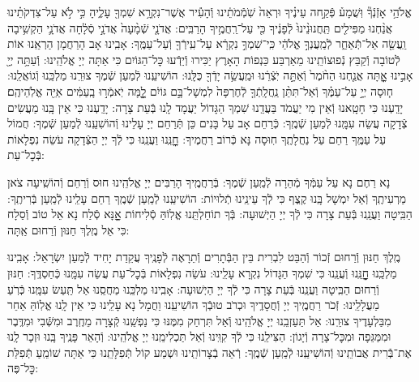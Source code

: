 \documentclass[twoside, openany, parskip=half, 11pt]{book}
\begin{document}
אֱלֹהַ֥י אָזְֿנְֿךָ֘ וּֽשֲׁמָע֒ פְּֿקַ֣חה עֵינֶ֗יךָ וּרְאֵה֙ שֹֽׁמְֿמֹתֵ֔ינוּ וְֿהָעִ֕יר אֲשֶׁר־נִקְרָ֥א שִׁמְךָ֖ עָלֶ֑יהָ כִּ֣י לֹ֣א עַל־צִדְקֹתֵ֗ינוּ אֲנַ֨חְנוּ מַפִּילִ֤ים תַּֽחֲנוּנֵ֨ינוּ֙ לְֿפָנֶ֔יךָ כִּ֖י עַל־רַֽחֲמֶ֥יךָ הָרַבִּֽים: אֲדֹנָ֤י שְֿׁמָ֨עָה֙ אֲדֹנָ֣י סְֿלָ֔חָה אֲדֹנָ֛י הַקְשִׁ֥יבָה וַֽעֲשֵׂ֖ה אַל־תְּֿֿאַחַ֑ר לְֿמַֽעֲנְךָ֣ אֱלֹהַ֔י כִּֽי־שִׁמְךָ֣ נִקְרָ֔א עַל־עִֽירְֿךָ֖ וְֿעַל־עַמֶּֽךָ: אָבִֽינוּ אָב הָרַחֲמָן הַרְאֵֽנוּ אוֹת לְֿטוֹבָה וְֿקַבֵּץ נְֿפוּצוֹתֵֽינוּ מֵאַרְבַּע כַּנְפוֹת הָאָרֶץ יַכִּירוּ וְֿיֵדְֿעוּ כׇּל־הַגּוֹיִם כִּי אַתָּה יְיָ אֱלֹהֵֽינוּ:
וְֿעַתָּ֥ה יְיָ֖ אָבִ֣ינוּ אׇׇׇׇׇׇָֽתָּה אֲנַ֤חְנוּ הַחֹ֨מֶר֙ וְֿאַתָּ֣ה יֹֽצְֿרֵ֔נוּ וּמַֽעֲשֵׂ֥ה יָדְֿךָ֖ כֻּלָּֽנוּ: הוֹשִׁיעֵֽנוּ לְֿמַעַן שְֿׁמֶךָ צוּרֵֽנוּ מַלְכֵּֽנוּ וְֿגוֹאֲלֵֽנוּ:
ח֧וּסָה יְיָ֣ עַל־עַמֶּ֗ךָ וְֿאַל־תִּתֵּ֨ן נַֽחֲלָֽתְֿךָ֤ לְֿחֶרְפָּה֙ לִמְשָׁל־בָּ֣ם גּוֹיִ֔ם לׇׇׇׇָ֚מָּה יֹֽאמְֿר֣וּ בָֽעַמִּ֔ים אַיֵּ֖ה אֱלֹֽהֵיהֶֽם׃ יָדַֽעְנוּ כִּי חָטָֽאנוּ וְֿאֵין מִי יַעֲמֹד בַּעֲדֵֽנוּ שִׁמְךָ הַגָּדוֹל יַעֲמָד לָֽנוּ בְּֿעֵת צָרָה: יָדַֽעְנוּ כִּי אֵין בָּֽנוּ מַעֲשִׂים צְֿדָקָה עֲשֵׂה עִמָּֽנוּ לְֿמַעַן שְֿׁמֶֽךָ: כְּֿרַחֵם אָב עַל בָּנִים כֵּן תְּֿרַחֵם יְיָ עָלֵינוּ וְֿהוֹשִׁעֵֽנוּ לְֿמַעַן שְֿׁמֶךָ: חֲמוֹל עַל עַמֶּֽךָ רַחֵם עַל נַחֲלָתֶֽךָ חֽוּסָה נָּא כְּֿרוֹב רַחֲמֶיךָ: חׇׇׇׇׇׇׇׇָנֵּֽנוּ וַעֲנֵֽנוּ כִּי לְֿךָ יְיָ הַצְּֿדָקָה עֹשֵׂה נִפְלָאוֹת בְּֿכׇל־עֵת:



נָא רַחֶם נָא עַל עַמְּֿךָ מְֿהֵרָה לְֿמַֽעַן שְֿׁמֶךָ: בְּֿרַחֲמֶֽיךָ הָרַבִּים יְיָ אֱלֹהֵֽינוּ חוּס וְֿרַחֵם וְֿהוֹשִֽׁיעָה צֹאן מַרְעִיתֶֽךָ וְֿאַל יִמְשָׁל בָּֽנוּ קֶֽצֶף כִּי לְֿךָ עֵינֵֽינוּ תְֿלוּיוֹת: הוֹשִׁיעֵֽנוּ לְֿמַֽעַן שְֿׁמֶֽךָ רַחֵם עָלֵֽינוּ לְֿמַֽעַן בְּֿרִיתֶֽךָ: הַבִּֽיטָה וַעֲנֵֽנוּ בְּֿעֵת צָרָה כִּי לְֿךָ יְיָ הַיְשׁוּעָה: בְּֿךָ תוֹחַלְתֵּֽנוּ אֱלֽוֹהַּ סְֿלִיחוֹת אׇׇׇׇָנָּא סְֿלַח נָא אֵל טוֹב וְֿסַלָח כִּי אֵל מֶֽלֶךְ חַנּוּן וְֿרַחוּם אַֽתָּה:

מֶֽלֶךְ חַנּוּן וְֿרַחוּם זְֿכוֹר וְֿהַבֵּט לִבְרִית בֵּין הַבְּֿתָרִים וְֿתֵרָאֶה לְֿפָנֶֽיךָ עֲקֵדַת יָחִיד לְֿמַעַן יִשְׂרָאֵל: אָבִֽינוּ מַלְכֵּֽנוּ חׇׇׇׇׇׇׇׇָנֵּֽנוּ וְֿעֲנֵֽנוּ כִּי שִׁמְךָ הַגָּדוֹל נִקְרָא עָלֵֽינוּ: עֹשֵׂה נִפְלָאוֹת בְּֿכׇל־עֵת עֲשֵׂה עִמָּֽנוּ כְּֿחַסְדֶּֽךָ: חַנּוּן וְֿרַחוּם הַבִּֽיטָה וַעֲנֵֽנוּ בְּֿעֵת צָרָה כִּי לְֿךָ יְיָ הַיְשׁוּעָה: אָבִֽינוּ מַלְכֵּֽנוּ מַחֲסֵֽנוּ אַל תַּֽעַשׂ עִמָּֽנוּ כְּֿרֹֽעַ מַעֲלָלֵֽינוּ: זְֿכֹר רַחֲמֶֽיךָ יְיָ וְֿחֲסָדֶֽיךָ וּכְרֹב טוּבְֿךָ הוֹשִׁיעֵֽנוּ וַחֲמָל נָא עָלֵֽינוּ כִּי אֵין לָֽנוּ אֱלֽוֹהַּ אַחֵר מִבַּלְעָדֶיךָ צוּרֵֽנוּ: אַל תַּעַזְבֵֽנוּ יְיָ אֱלֹהֵֽינוּ וְֿאַל תִּרְחַק מִמֶּנּוּ כִּי נַפְשֵֽׁנוּ קְֿצָרָה מֵחֶֽרֶב וּמִשְּֿׁבִי וּמִדֶּֽבֶר וּמִמַּגֵּפָה וּמִכׇּל־צָרָה וְֿיָגוֹן: הַצִּילֵֽנוּ כִּי לְֿךָ קִוִּֽינוּ וְֿאַל תַּכְלִימֵֽנוּ יְיָ אֱלֹהֵֽינוּ: וְֿהָאֵר פָּנֶֽיךָ בָּֽנוּ וּזְכָר לָֽנוּ אֶת־בְּֿֿרִית אֲבוֹתֵֽינוּ וְֿהוֹשִׁיעֵֽנוּ לְֿמַֽעַן שְֿׁמֶֽךָ: רְֿאֵה בְֿצָרוֹתֵֽינוּ וּשְׁמַע קוֹל תְּֿפִלָּתֵֽנוּ כִּי אַתָּה שׁוֹמֵֽעַ תְּֿפִלַּת כׇּל־פֶּה:
\end{document}
